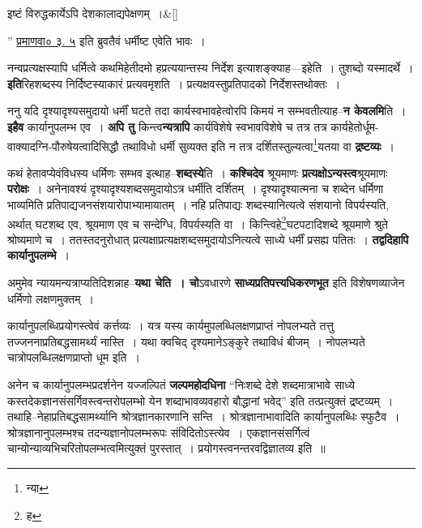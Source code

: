 \documentclass[article,12pt,a4paper]{memoir}
\begin{document}
	    
	    \stanza[\smallbreak]
	इष्टं विरुद्धकार्येऽपि देशकालाद्यपेक्षणम् ।\&[\smallbreak]


	
	    \pstart
	  ” \href{http://http://sarit.indology.info/?cref=pv.3.5}{प्रमाणवा० ३. ५} इति ब्रुवतैवं धर्मीष्ट एवेति भावः ।
	\pend
      

	  \pstart नन्वप्रत्यक्षस्यापि धर्मित्वे कथमिहेतीदमो हप्रत्ययान्तस्य निर्देश इत्याशङ्क्याह—इहेति । तुशब्दो यस्मादर्थे । \textbf{इति}रिहशब्दस्य निर्दिष्टस्याकारं प्रत्यवमृशति । प्रत्यक्षवस्तुप्रतिपादको निर्देशस्तथोक्तः ।
	\pend
      

	  \pstart ननु यदि दृश्यादृश्यसमुदायो धर्मीं घटते तदा कार्यस्वभावहेत्वोरपि किमयं न सम्भवतीत्याह--\textbf{न केवलमि}ति । \textbf{इहैव} कार्यानुपलम्भ एव । \textbf{अपि तु} किन्त्व\textbf{न्यत्रापि} कार्यविशेषे स्वभावविशेषे च तत्र तत्र कार्यहेतोर्धूम-वाक्यादग्नि-पौरुषेयत्वादिसिद्धौ तथाविधो धर्मी सुव्यक्त इति न तत्र दर्शितस्तुल्यत्वा\footnote{न्या}\-यतया वा \textbf{द्रष्टव्यः} ।
	\pend
      

	  \pstart कथं हेतावप्येवंविधस्य धर्मिणः सम्भव इत्थाह--\textbf{शब्दस्ये}ति । \textbf{कश्चिदेव} श्रूयमाणः \textbf{प्रत्यक्षोऽन्यस्त्व}श्रूयमाणः \textbf{परोक्षः} । अनेनावश्यं दृश्यादृश्यशब्दसमुदायोऽत्र धर्मीति दर्शितम् । दृश्यादृश्यात्मना च शब्देन धर्मिणा भाव्यमिति प्रतिपाद्यजनसंशयारोपाभ्यामायातम् । नहि प्र\leavevmode{}तिपाद्यः शब्दस्यानित्यत्वे संशयानो विपर्यस्यति, अर्थात् घटशब्द एव, श्रूयमाण एव च सन्देग्धि, विपर्यस्यति वा । किन्त्विहे\footnote{ह}\-घटपटादिशब्दे श्रूयमाणे श्रुते श्रोष्यमाणे च । ततस्तदनुरोधात् प्रत्यक्षाप्रत्यक्षशब्दसमुदायोऽनित्यत्वे साध्ये धर्मीं प्रसह्य पतितः । \textbf{तद्वदिहापि कार्यानुपलम्भे} ।
	\pend
      

	  \pstart अमुमेव न्यायमन्यत्राप्यतिदिशन्नाह--\textbf{यथा चेति । चो}ऽवधारणे \textbf{साध्यप्रतिपत्त्यधिकरणभूत} इति विशेषणव्याजेन धर्मिणो लक्षणमुक्तम् ।
	\pend
      

	  \pstart कार्यानुपलब्धिप्रयोगस्त्वेवं कर्त्तव्यः । यत्र यस्य कार्यमुपलब्धिलक्षणप्राप्तं नोपलभ्यते तत्तु तज्जननाप्रतिबद्धसामर्थ्यं नास्ति । यथा क्वचिद् दृश्यमानेऽङ्कुरे तथाविधं बीजम् । नोपलभ्यते चात्रोपलब्धिलक्षणप्राप्तो धूम इति ।
	\pend
      

	  \pstart अनेन च कार्यानुपलम्भप्रदर्शनेन यज्जल्पितं \textbf{जल्पमहोदधिना} “निःशब्दे देशे शब्दमात्राभावे साध्ये कस्तदेकज्ञानसंसर्गिवस्त्वन्तरोपलम्भो येन शब्दाभावव्यवहारो बौद्धानां भवेद्” इति तत्प्रत्युक्तं द्रष्टव्यम् । तथाहि--नेहाप्रतिबद्धसामर्थ्यानि श्रोत्रज्ञानकारणानि सन्ति । श्रोत्रज्ञानाभावादिति कार्यानुपलब्धिः स्फुटैव । श्रोत्रज्ञानानुपलम्भश्च तदन्यज्ञानोपलम्भरूपः संविदितोऽस्त्येव । एकज्ञानसंसर्गित्वं चान्योन्याव्यभिचरितोपलम्भत्वमित्युक्तं पुरस्तात् । प्रयोगस्त्वनन्तरवद्विज्ञातव्य इति ॥
	\pend
	  \bigskip
	  \begingroup
	
\end{document}
